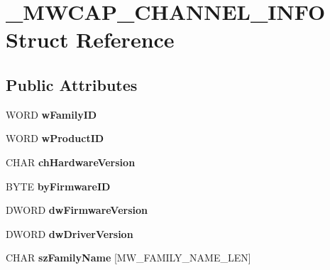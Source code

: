 \hypertarget{struct__MWCAP__CHANNEL__INFO}{\section{\-\_\-\-M\-W\-C\-A\-P\-\_\-\-C\-H\-A\-N\-N\-E\-L\-\_\-\-I\-N\-F\-O Struct Reference}
\label{struct__MWCAP__CHANNEL__INFO}
}
\subsection*{Public Attributes}
\begin{DoxyCompactItemize}
\item 
\hypertarget{struct__MWCAP__CHANNEL__INFO_a199f7c90f1c7e9cd790c86d561518d5c}{W\-O\-R\-D {\bfseries w\-Family\-I\-D}}\label{struct__MWCAP__CHANNEL__INFO_a199f7c90f1c7e9cd790c86d561518d5c}

\item 
\hypertarget{struct__MWCAP__CHANNEL__INFO_a580c2e68e2b37479799a58a6756e5278}{W\-O\-R\-D {\bfseries w\-Product\-I\-D}}\label{struct__MWCAP__CHANNEL__INFO_a580c2e68e2b37479799a58a6756e5278}

\item 
\hypertarget{struct__MWCAP__CHANNEL__INFO_a7e36fd5152b9cbdadda380c2af183cc6}{C\-H\-A\-R {\bfseries ch\-Hardware\-Version}}\label{struct__MWCAP__CHANNEL__INFO_a7e36fd5152b9cbdadda380c2af183cc6}

\item 
\hypertarget{struct__MWCAP__CHANNEL__INFO_a764ab24baf2fd2ea7de1370a9cf87f54}{B\-Y\-T\-E {\bfseries by\-Firmware\-I\-D}}\label{struct__MWCAP__CHANNEL__INFO_a764ab24baf2fd2ea7de1370a9cf87f54}

\item 
\hypertarget{struct__MWCAP__CHANNEL__INFO_a7e0b83cb3539432dfdfa91695a3a9519}{D\-W\-O\-R\-D {\bfseries dw\-Firmware\-Version}}\label{struct__MWCAP__CHANNEL__INFO_a7e0b83cb3539432dfdfa91695a3a9519}

\item 
\hypertarget{struct__MWCAP__CHANNEL__INFO_a90724833f4bdea3b059419700ad7421a}{D\-W\-O\-R\-D {\bfseries dw\-Driver\-Version}}\label{struct__MWCAP__CHANNEL__INFO_a90724833f4bdea3b059419700ad7421a}

\item 
\hypertarget{struct__MWCAP__CHANNEL__INFO_acc1e2e08b8c3dd94a9bf50ed02b4dbc3}{C\-H\-A\-R {\bfseries sz\-Family\-Name} \mbox{[}M\-W\-\_\-\-F\-A\-M\-I\-L\-Y\-\_\-\-N\-A\-M\-E\-\_\-\-L\-E\-N\mbox{]}}\label{struct__MWCAP__CHANNEL__INFO_acc1e2e08b8c3dd94a9bf50ed02b4dbc3}


\end{DoxyCompactItemize}
